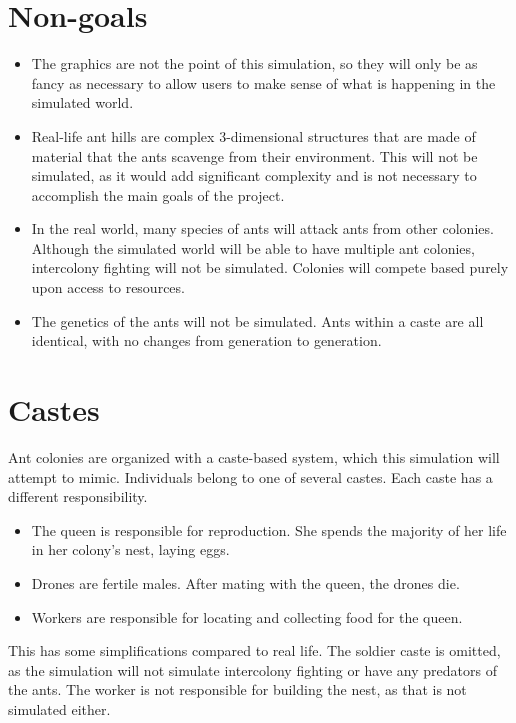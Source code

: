 \documentclass[journal]{IEEEtran}
\begin{document}
\section{Non-goals}

\begin{itemize}
\item The graphics are not the point of this simulation, so they will only be as fancy as necessary to allow users to make sense of what is happening in the simulated world.
\item Real-life ant hills are complex 3-dimensional structures that are made of material that the ants scavenge from their environment.  This will not be simulated, as it would add significant complexity and is not necessary to accomplish the main goals of the project.
\item In the real world, many species of ants will attack ants from other colonies.  Although the simulated world will be able to have multiple ant colonies, intercolony fighting will not be simulated.  Colonies will compete based purely upon access to resources.
\item The genetics of the ants will not be simulated.  Ants within a caste are all identical, with no changes from generation to generation.
\end{itemize}

\section{Castes}

Ant colonies are organized with a caste-based system, which this simulation will attempt to mimic.  Individuals belong to one of several castes.  Each caste has a different responsibility.

\begin{itemize}
\item The queen is responsible for reproduction.  She spends the majority of her life in her colony's nest, laying eggs.
\item Drones are fertile males.  After mating with the queen, the drones die.
\item Workers are responsible for locating and collecting food for the queen.
\end{itemize}

This has some simplifications compared to real life.  The soldier caste is omitted, as the simulation will not simulate intercolony fighting or have any predators of the ants.  The worker is not responsible for building the nest, as that is not simulated either.
\end{document}
